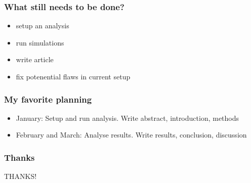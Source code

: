\documentclass{beamer}
\begin{document}
\begin{frame}
  \frametitle{What still needs to be done?}

  \begin{itemize}
    \item setup an analysis
    \item run simulations
    \item write article
    \item fix potenential flaws in current setup
  \end{itemize}

\end{frame}

\begin{frame}
  \frametitle{My favorite planning}

  \begin{itemize}
    \item January: Setup and run analysis. Write abstract, introduction, methods
    \item February and March: Analyse results. Write results, conclusion, discussion
  \end{itemize}

\end{frame}


\begin{frame}
  \frametitle{Thanks}
  
  \center
  \Huge
  \faSmileO THANKS! \faSmileO

\end{frame}
\end{document}
